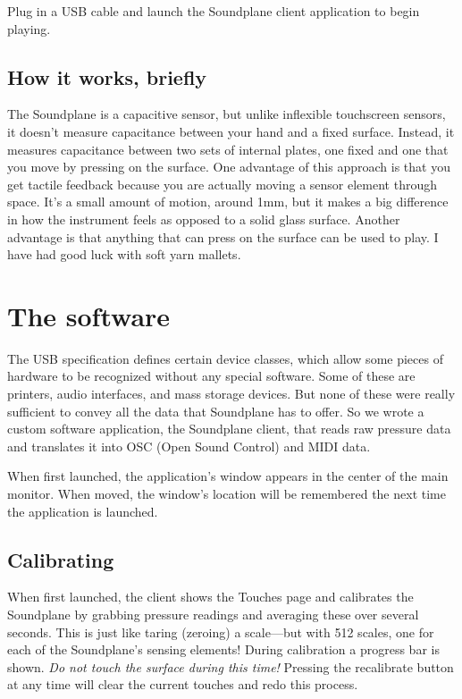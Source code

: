 Plug in a USB cable and launch the Soundplane client application to begin playing.  

\section{How it works, briefly}

The Soundplane is a capacitive sensor, but unlike inflexible touchscreen sensors, it doesn't measure capacitance between your hand and a fixed surface.  Instead, it measures capacitance between two sets of internal plates, one fixed and one that you move by pressing on the surface.  One advantage of this approach is that you get tactile feedback because you are actually moving a sensor element through space.  It's a small amount of motion, around 1mm, but it makes a big difference in how the instrument feels as opposed to a solid glass surface.  Another advantage is that anything that can press on the surface can be used to play.  I have had good luck with soft yarn mallets. 

\chapter{The software}

The USB specification defines certain device classes, which allow some pieces of hardware to be recognized without any special software.  Some of these are printers, audio interfaces, and mass storage devices.  But none of these were really sufficient to convey all the data that Soundplane has to offer.  So we wrote a custom software application, the Soundplane client, that reads raw pressure data and translates it into OSC (Open Sound Control) and MIDI data.   

When first launched, the application's window appears in the center of the main monitor. When moved, the window's location will be remembered the next time the application is launched. 

\section{Calibrating}

When first launched, the client shows the Touches page and calibrates the Soundplane by grabbing pressure readings and averaging these over several seconds.  This is just like taring (zeroing) a scale—but with 512 scales, one for each of the Soundplane’s sensing elements!  During calibration a progress bar is shown.  \emph{Do not touch the surface during this time!}  Pressing the recalibrate button at any time will clear the current touches and redo this process. 

